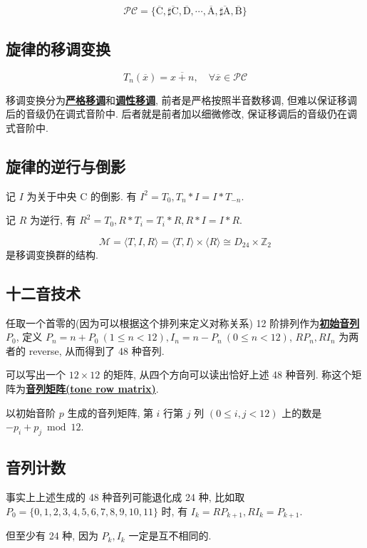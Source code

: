 \documentclass[8pt]{article}
\theoremstyle{compact}
\def\obj#1{\textbf{\uline{#1}}}
\def\le{\leqslant}
\def\A{\textrm{A}}
\def\B{\textrm{B}}
\def\C{\textrm{C}}
\def\D{\textrm{D}}
\begin{document}
$$\mathcal{PC} = \{\overline{\C}, \overline{\sharp\C}, \overline{\D}, \cdots, \overline{\A}, \overline{\sharp\A}, \overline{\B}\}$$

\subsection{旋律的移调变换}

$$T_n(\overline{x}) = \overline{x + n}, \quad \forall \overline{x} \in \mathcal{PC}$$

移调变换分为\obj{严格移调}和\obj{调性移调}, 前者是严格按照半音数移调, 但难以保证移调后的音级仍在调式音阶中. 后者就是前者加以细微修改, 保证移调后的音级仍在调式音阶中.

\subsection{旋律的逆行与倒影}

记 $I$ 为关于中央 C 的倒影. 有 $I^2 = T_0, T_n * I = I * T_{-n}$.

记 $R$ 为逆行, 有 $R^2 = T_0, R * T_i = T_i * R, R * I = I * R$.

$$\mathcal M = \langle T, I, R \rangle = \langle T, I \rangle \times \langle R \rangle \cong D_{24} \times \mathbb Z_2$$ 是移调变换群的结构.

\subsection{十二音技术}

任取一个首零的(因为可以根据这个排列来定义对称关系) 12 阶排列作为\obj{初始音列} $P_0$, 定义 $P_n = n + P_0 \ (1 \le n < 12), I_n = n - P_n \ (0 \le n < 12)$, $RP_n, RI_n$ 为两者的 reverse, 从而得到了 48 种音列.

可以写出一个 $12 \times 12$ 的矩阵, 从四个方向可以读出恰好上述 48 种音列. 称这个矩阵为\obj{音列矩阵(tone row matrix)}.

以初始音阶 $p$ 生成的音列矩阵, 第 $i$ 行第 $j$ 列 $(0 \le i, j < 12)$ 上的数是 $- p_i + p_j \bmod 12$.

\subsection{音列计数}

事实上上述生成的 48 种音列可能退化成 24 种, 比如取 $P_0 = \{0, 1, 2, 3, 4, 5, 6, 7, 8, 9, 10, 11\}$ 时, 有 $I_k = RP_{k+1}, RI_k = P_{k+1}$.

但至少有 24 种, 因为 $P_k, I_k$ 一定是互不相同的.
\end{document}

